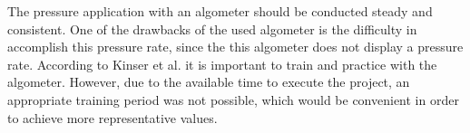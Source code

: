 The pressure application with an algometer should be conducted steady and consistent.
One of the drawbacks of the used algometer is the difficulty in accomplish this pressure
rate, since the this algometer does not display a pressure rate.
According to Kinser et al. \cite{Kinser2009} it is important to train and practice with the algometer.
However, due to the available time
to execute the project, an appropriate training period was not possible, which would be
convenient in order to achieve more representative values.





